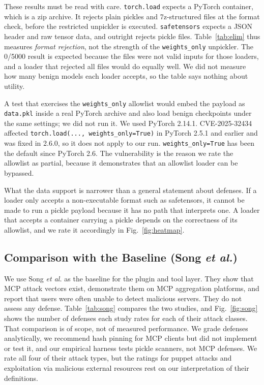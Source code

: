 \documentclass[conference]{IEEEtran}
\begin{document}
These results must be read with care. \texttt{torch.load} expects a PyTorch container, which is a zip archive. It rejects plain pickles and 7z-structured files at the format check, before the restricted unpickler is executed. \texttt{safetensors} expects a JSON header and raw tensor data, and outright rejects pickle files. Table~\ref{tab:elim} thus measures \emph{format rejection}, not the strength of the \texttt{weights\_only} unpickler. The 0/5000 result is expected because the files were not valid inputs for those loaders, and a loader that rejected all files would do equally well. We did not measure how many benign models each loader accepts, so the table says nothing about utility.

A test that exercises the \texttt{weights\_only} allowlist would embed the payload as \texttt{data.pkl} inside a real PyTorch archive and also load benign checkpoints under the same settings; we did not run it. We used PyTorch 2.14.1. CVE-2025-32434 affected \texttt{torch.load(..., weights\_only=True)} in PyTorch 2.5.1 and earlier and was fixed in 2.6.0, so it does not apply to our run. \texttt{weights\_only=True} has been the default since PyTorch 2.6. The vulnerability is the reason we rate the allowlist as partial, because it demonstrates that an allowlist loader can be bypassed.

What the data support is narrower than a general statement about defenses. If a loader only accepts a non-executable format such as safetensors, it cannot be made to run a pickle payload because it has no path that interprets one. A loader that accepts a container carrying a pickle depends on the correctness of its allowlist, and we rate it accordingly in Fig.~\ref{fig:heatmap}.

\subsection{Comparison with the Baseline (Song \textit{et al.})}
\label{sec:baseline}

We use Song \textit{et al.} as the baseline for the plugin and tool layer. They show that MCP attack vectors exist, demonstrate them on MCP aggregation platforms, and report that users were often unable to detect malicious servers. They do not assess any defense. Table~\ref{tab:song} compares the two studies, and Fig.~\ref{fig:song} shows the number of defenses each study rates for each of their attack classes. That comparison is of scope, not of measured performance. We grade defenses analytically, we recommend hash pinning for MCP clients but did not implement or test it, and our empirical harness tests pickle scanners, not MCP defenses. We rate all four of their attack types, but the ratings for puppet attacks and exploitation via malicious external resources rest on our interpretation of their definitions.
\end{document}
